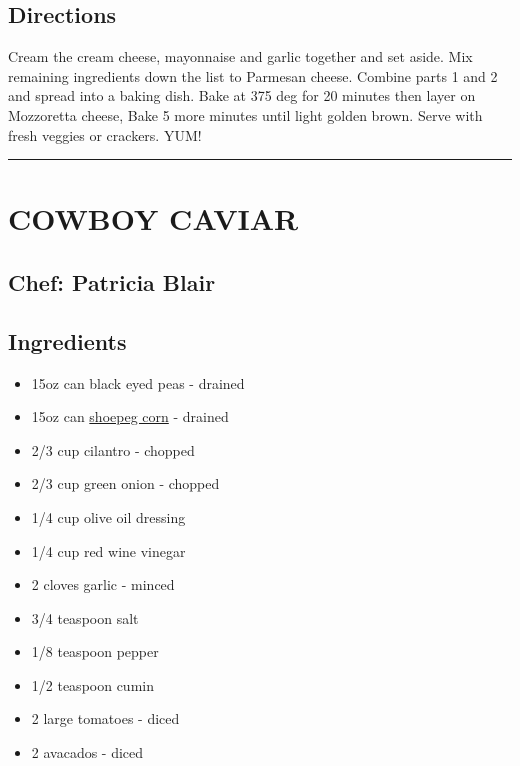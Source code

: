 \documentclass[
]{book}
\providecommand{\tightlist}{%
  \setlength{\itemsep}{0pt}\setlength{\parskip}{0pt}}
\begin{document}
\hypertarget{directions}{%
\subsection*{Directions}\label{directions}}


Cream the cream cheese, mayonnaise and garlic together and set aside.
Mix remaining ingredients down the list to Parmesan cheese.
Combine parts 1 and 2 and spread into a baking dish.
Bake at 375 deg for 20 minutes then layer on Mozzoretta cheese,
Bake 5 more minutes until light golden brown.
Serve with fresh veggies or crackers.
YUM!

\begin{center}\rule{0.5\linewidth}{0.5pt}\end{center}

\hypertarget{cowboy-caviar}{%
\section*{COWBOY CAVIAR}\label{cowboy-caviar}}


\hypertarget{chef-patricia-blair}{%
\subsection*{Chef: Patricia Blair}\label{chef-patricia-blair}}


\hypertarget{ingredients-1}{%
\subsection*{Ingredients}\label{ingredients-1}}


\begin{itemize}
\tightlist
\item
  15oz can black eyed peas - drained
\item
  15oz can \href{https://en.wikipedia.org/wiki/Shoepeg_corn}{shoepeg corn} - drained
\item
  2/3 cup cilantro - chopped
\item
  2/3 cup green onion - chopped
\item
  1/4 cup olive oil dressing
\item
  1/4 cup red wine vinegar
\item
  2 cloves garlic - minced
\item
  3/4 teaspoon salt
\item
  1/8 teaspoon pepper
\item
  1/2 teaspoon cumin
\item
  2 large tomatoes - diced
\item
  2 avacados - diced
\end{itemize}
\end{document}
